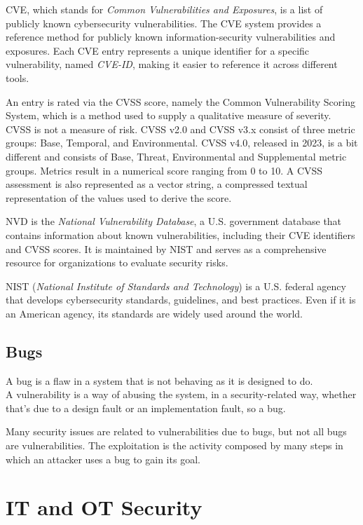 CVE, which stands for \textit{Common Vulnerabilities and Exposures}, is a list of publicly known cybersecurity vulnerabilities. The CVE system provides a reference method for publicly known information-security vulnerabilities and exposures. Each CVE entry represents a unique identifier for a specific vulnerability, named \textit{CVE-ID}, making it easier to reference it across different tools.

An entry is rated via the CVSS score, namely the Common Vulnerability Scoring System, which is a method used to supply a qualitative measure of severity. CVSS is not a measure of risk. CVSS v2.0 and CVSS v3.x consist of three metric groups: Base, Temporal, and Environmental. CVSS v4.0, released in 2023, is a bit different and consists of Base, Threat, Environmental and Supplemental metric groups. Metrics result in a numerical score ranging from 0 to 10. A CVSS assessment is also represented as a vector string, a compressed textual representation of the values used to derive the score.~\cite{cvss-metrics}


NVD is the \textit{National Vulnerability Database}, a U.S. government database that contains information about known vulnerabilities, including their CVE identifiers and CVSS scores. It is maintained by NIST and serves as a comprehensive resource for organizations to evaluate security risks.

NIST (\textit{National Institute of Standards and Technology}) is a U.S. federal agency that develops cybersecurity standards, guidelines, and best practices. Even if it is an American agency, its standards are widely used around the world.

\subsection{Bugs}

A bug is a flaw in a system that is not behaving as it is designed to do.\\
A vulnerability is a way of abusing the system, in a security-related way, whether that's due to a design fault or an implementation fault, so a bug.

Many security issues are related to vulnerabilities due to bugs, but not all bugs are vulnerabilities. The exploitation is the activity composed by many steps in which an attacker uses a bug to gain its goal.

\section{IT and OT Security}

